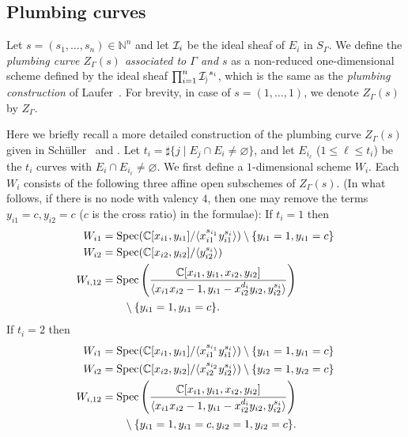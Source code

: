 \documentclass[a4paper, reqno, twoside]{amsart}
\theoremstyle{definition}
\numberwithin{equation}{section}
\begin{document}
\subsection{Plumbing curves}

Let $s=(s_1, \dotsc, s_n) \in \mathbb{N}^n$ and let ${\ensuremath \mathcal{I}}_i$ be
the ideal sheaf of $E_i$ in $S_{\Gamma}$. We define the \emph{plumbing
  curve $Z_{\Gamma}(s)$ associated to $\Gamma$ and $s$} as a
non-reduced one-dimensional scheme defined by the ideal sheaf
$\prod_{i=1}^{n} {\ensuremath \mathcal{I_i}}^{s_i}$, which is the same as the
\emph{plumbing construction} of
Laufer~\cite[Theorem~3.9]{Laufer-1973}. For brevity, in case of
$s=(1,\dotsc,1)$, we denote $Z_{\Gamma}(s)$ by $Z_{\Gamma}$.

Here we briefly recall a more detailed construction of the plumbing
curve $Z_{\Gamma}(s)$ given in Sch\"uller~\cite[\S3]{Schuller-2012}
and \cite[\S4]{Schuller-2012-thesis}. Let $t_i=\sharp \{j \mid E_j
\cap E_i \neq \varnothing \}$, and let $E_{i_\ell}$ ($1 \le \ell \le
t_i$) be the $t_i$ curves with $E_i \cap E_{i_\ell} \neq
\varnothing$. We first define a $1$-dimensional scheme $W_i$. Each
$W_i$ consists of the following three affine open subschemes of
$Z_{\Gamma}(s)$. (In what follows, if there is no node with valency
$4$, then one may remove the terms $y_{i1}=c, y_{i2}=c$ ($c$ is the
cross ratio) in the formulae): If $t_i=1$ then
\begin{align*}\allowdisplaybreaks
W_{i1} &= \operatorname{Spec}(\mathbb{C}[x_{i1}, y_{i1}]/\langle x_{i1}^{s_{i_1}}y_{i1}^{s_i}\rangle) \setminus \{y_{i1}=1, y_{i1}=c\} \\
W_{i2} &= \operatorname{Spec}(\mathbb{C}[x_{i2}, y_{i2}]/\langle y_{i2}^{s_i}\rangle) \\
W_{i,12} &= \operatorname{Spec}\left(\frac{\mathbb{C}[x_{i1}, y_{i1}, x_{i2}, y_{i2}]}{\langle x_{i1}x_{i2}-1, y_{i1}-x_{i2}^{d_i}y_{i2}, y_{i2}^{s_i}\rangle}\right)  \\
&\qquad \setminus \{y_{i1}=1, y_{i1}=c\}.
\end{align*}
If $t_i=2$ then
\begin{align*}\allowdisplaybreaks
W_{i1} &= \operatorname{Spec}(\mathbb{C}[x_{i1}, y_{i1}]/\langle x_{i1}^{s_{i_1}}y_{i1}^{s_i}\rangle) \setminus \{y_{i1}=1, y_{i1}=c\} \\
W_{i2} &= \operatorname{Spec}(\mathbb{C}[x_{i2}, y_{i2}]/\langle x_{i2}^{s_{i_2}} y_{i2}^{s_i}\rangle) \setminus \{y_{i2}=1, y_{i2}=c\} \\
W_{i,12} &= \operatorname{Spec}\left(\frac{\mathbb{C}[x_{i1}, y_{i1}, x_{i2}, y_{i2}]}{\langle x_{i1}x_{i2}-1, y_{i1}-x_{i2}^{d_i}y_{i2}, y_{i2}^{s_i}\rangle}\right) \\
&\qquad \setminus\{y_{i1}=1, y_{i1}=c, y_{i2}=1, y_{i2}=c\}.
\end{align*}
\end{document}

